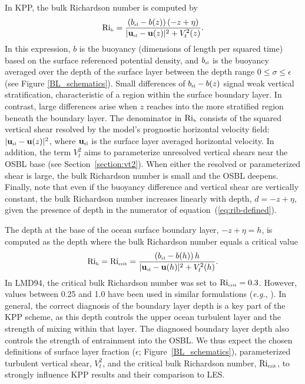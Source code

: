 \documentclass[preprint,12pt,authoryear]{agujournal}
\begin{document}
In KPP, the bulk Richardson number is computed by
\begin{equation}
\mbox{Ri}_{\mbox{\tiny b}} = \frac{ (b_{\tiny \mbox{sl}} - b(z)) \, (-z+\eta) }{|\mathbf{u}_{\tiny \mbox{sl}} - \mathbf{u}(z)|^2 + V_t^2(z) }.
\label{eq:rib-defined}
\end{equation}
In this expression, $b$ is the buoyancy (dimensions of length per squared time) based on the surface referenced potential density, and $b_{\tiny \mbox{sl}}$ is the  buoyancy averaged over the depth of the surface layer between the depth range $0 \le \sigma \le \epsilon$ (see Figure \ref{BL_schematics}). Small differences of $b_{\tiny \mbox{sl}} - b(z)$ signal weak vertical stratification, characteristic of a region within the surface boundary layer. In contrast, large differences arise when $z$ reaches into the more stratified region beneath the boundary layer. The denominator in $\mbox{Ri}_{\mbox{\tiny b}}$ consists of the squared vertical shear resolved by the model's prognostic horizontal velocity field:   
$|\mathbf{u}_{\tiny \mbox{sl}} - \mathbf{u}(z)|^2$, where $\mathbf{u}_{\tiny \mbox{sl}}$ is the surface layer averaged horizontal velocity. In addition, the term $V_t^2$ aims to parameterize unresolved vertical shears near the OSBL base (see Section~\ref{section:vt2}). When either the resolved or parameterized shear is large, the bulk Richardson number is small and the OSBL deepens.  Finally, note that even if the buoyancy difference and vertical shear are vertically constant, the bulk Richardson number increases linearly with depth, $d = -z+\eta$, given the presence of depth in the numerator of equation~(\ref{eq:rib-defined}).

The depth at the base of the ocean surface boundary layer, $-z+\eta = h$, is computed as the depth where the bulk Richardson number equals a critical value
\begin{equation}
\mbox{Ri}_{\mbox{\tiny b}} = \mbox{Ri}_{\mbox{\tiny crit}} = \frac{ (b_{\tiny \mbox{\tiny \mbox{sl}}} - b(h)) \, h }{|\mathbf{u}_{\tiny \mbox{\tiny \mbox{sl}}} - \mathbf{u}(h)|^2 + V_t^2(h) }.
\label{eq:KPP-boundary-layer-depth-defined}
\end{equation}
In LMD94, the critical bulk Richardson number was set to $\mbox{Ri}_{\mbox{\tiny crit}} = 0.3$. However, values between 0.25 and 1.0 have been used in similar formulations (\textit{e.g.}, \citealp{troen1986simple,Vogelezang1996,Mcgrath-Spangler2015}). In general, the correct diagnosis of the boundary layer depth is a key part of the KPP scheme, as this depth controls the upper ocean turbulent layer and the strength of mixing within that layer.  The diagnosed boundary layer depth also controls the strength of entrainment into the OSBL.  We thus expect the chosen definitions of surface layer fraction ($\epsilon$; Figure~\ref{BL_schematics}),  parameterized turbulent vertical shear, $V_t^2$, and the critical bulk Richardson number, $\mbox{Ri}_{\mbox{\tiny crit}}$, to strongly influence KPP results and their comparison to LES.
\end{document}
